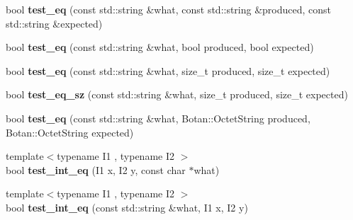 \begin{DoxyCompactItemize}
\mbox{\label{class_botan___tests_1_1_test_1_1_result_a88b8630822dcdfc0c12e4d81e8b88dfe}} 
bool {\bfseries test\+\_\+eq} (const std\+::string \&what, const std\+::string \&produced, const std\+::string \&expected)
\item 
\mbox{\label{class_botan___tests_1_1_test_1_1_result_a27796b141fe750d4926d05370d7fbfbc}} 
bool {\bfseries test\+\_\+eq} (const std\+::string \&what, bool produced, bool expected)
\item 
\mbox{\label{class_botan___tests_1_1_test_1_1_result_af63f1a33be4b29649dc8ea550607ad5a}} 
bool {\bfseries test\+\_\+eq} (const std\+::string \&what, size\+\_\+t produced, size\+\_\+t expected)
\item 
\mbox{\label{class_botan___tests_1_1_test_1_1_result_aa9212884af50de5cd672517c8860d599}} 
bool {\bfseries test\+\_\+eq\+\_\+sz} (const std\+::string \&what, size\+\_\+t produced, size\+\_\+t expected)
\item 
\mbox{\label{class_botan___tests_1_1_test_1_1_result_aadf90a63eb54ee29bc4966d4be6940fd}} 
bool {\bfseries test\+\_\+eq} (const std\+::string \&what, Botan\+::\+Octet\+String produced, Botan\+::\+Octet\+String expected)
\item 
\mbox{\label{class_botan___tests_1_1_test_1_1_result_adf1bfb5a3f29fd29018302283c98d16b}} 
{\footnotesize template$<$typename I1 , typename I2 $>$ }\\bool {\bfseries test\+\_\+int\+\_\+eq} (I1 x, I2 y, const char $\ast$what)
\item 
\mbox{\label{class_botan___tests_1_1_test_1_1_result_a03a264bf3cd08341ec3076ab0b58111b}} 
{\footnotesize template$<$typename I1 , typename I2 $>$ }\\bool {\bfseries test\+\_\+int\+\_\+eq} (const std\+::string \&what, I1 x, I2 y)
\item 
\mbox{\label{class_botan___tests_1_1_test_1_1_result_aa2470a371cd72131393b66ec6257bb90}} 

\end{DoxyCompactItemize}
